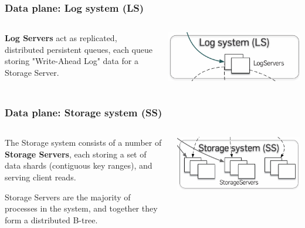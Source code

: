 

\begin{frame}
    \frametitle{Data plane: Log system (LS)}
    \begin{columns}
        \begin{column}{0.5\textwidth}
        \textbf{Log Servers} act as replicated, distributed persistent queues, each queue storing "Write-Ahead Log" data for a Storage Server.
        
        \end{column}
        \begin{column}{0.5\textwidth}
            \centering
            \includegraphics[width=\textwidth]{img/2-Architecture/log system.png}
        \end{column}
    \end{columns}
\end{frame}



\begin{frame}
    \frametitle{Data plane: Storage system (SS)}
    \begin{columns}
        \begin{column}{0.5\textwidth}
        The Storage system consists of a number of \textbf{Storage Servers}, each
storing a set of data shards (contiguous key ranges),
and serving client reads. 
\vspace{0.5cm}

Storage Servers are the majority of processes in the system, and together they form a distributed B-tree.
        
        \end{column}
        \begin{column}{0.5\textwidth}
            \centering
            \includegraphics[width=\textwidth]{img/2-Architecture/Storage system.png}
        \end{column}
    \end{columns}
\end{frame}

